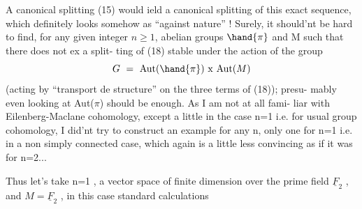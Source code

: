 A canonical splitting (15) would ield a canonical splitting of this
exact sequence, which definitely looks somehow as ``against nature'' !
Surely, it should'nt be hard to find, for any given integer $n \geq 1$,
 abelian groups $\hand{\pi}$ and M\hand{,} such that there does not ex a split-%
ting of (18) stable under the action of the group
\[ G \ = \ \mathrm{Aut}(\hand{\pi}) \ \mathrm{x} \ \mathrm{Aut}(M) \]
(acting by ``transport de structure'' on the three terms of (18)); presu-%
mably even\hand{,} looking at Aut($\pi$) should be enough. As I am not at all fami-%
liar with Eilenberg-Maclane cohomology, except a little in the case n=1
i.e. for usual group cohomology, I did'nt try to construct an example
for any n, only one for n=1 i.e. in a non simply connected case, which
again is a little less convincing as if it was  for n=2...

Thus let's take n=1 , a vector space of finite dimension over
the prime field $\underline{F}_2$ , and $M = \underline{F}_2$ , in this case standard calculations
